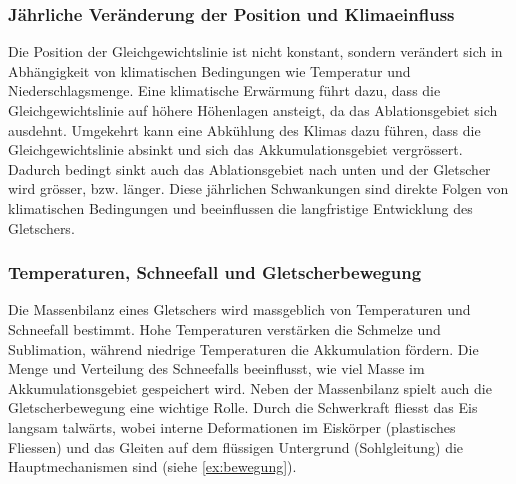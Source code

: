 \subsubsection{Jährliche Veränderung der Position und Klimaeinfluss}

Die Position der Gleichgewichtslinie ist nicht konstant, sondern verändert sich in Abhängigkeit von klimatischen Bedingungen wie Temperatur und Niederschlagsmenge. Eine klimatische Erwärmung führt dazu, dass die Gleichgewichtslinie auf höhere Höhenlagen ansteigt, da das Ablationsgebiet sich ausdehnt. Umgekehrt kann eine Abkühlung des Klimas dazu führen, dass die Gleichgewichtslinie absinkt und sich das Akkumulationsgebiet vergrössert. Dadurch bedingt sinkt auch das Ablationsgebiet nach unten und der Gletscher wird grösser, bzw. länger. Diese jährlichen Schwankungen sind direkte Folgen von klimatischen Bedingungen und beeinflussen die langfristige Entwicklung des Gletschers.

\subsubsection{Temperaturen, Schneefall und Gletscherbewegung}

Die Massenbilanz eines Gletschers wird massgeblich von Temperaturen und Schneefall bestimmt. Hohe Temperaturen verstärken die Schmelze und Sublimation, während niedrige Temperaturen die Akkumulation fördern. Die Menge und Verteilung des Schneefalls beeinflusst, wie viel Masse im Akkumulationsgebiet gespeichert wird. Neben der Massenbilanz spielt auch die Gletscherbewegung eine wichtige Rolle. Durch die Schwerkraft fliesst das Eis langsam talwärts, wobei interne Deformationen im Eiskörper (plastisches Fliessen) und das Gleiten auf dem flüssigen Untergrund (Sohlgleitung) die Hauptmechanismen sind (siehe \cref{ex:bewegung}).


